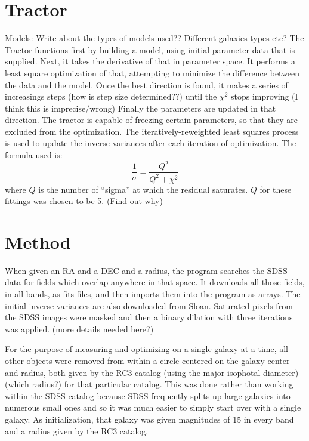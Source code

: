 \documentclass[12pt,preprint,dvipdf]{aastex}
\begin{document}
\section{Tractor}
Models: Write about the types of models used?? Different galaxies types etc?
The Tractor functions first by building a model, using initial parameter data that is supplied. Next, it takes the derivative of that in parameter space. It performs a least square optimization of that, attempting to minimize the difference between the data and the model. Once the best direction is found, it makes a series of increasings steps (how is step size determined??) until the $\chi^2$ stops improving (I think this is imprecise/wrong) Finally the parameters are updated in that direction. The tractor is capable of freezing certain parameters, so that they are excluded from the optimization. 
The iteratively-reweighted least squares process is used to update the
inverse variances after each iteration of optimization. The formula
used is: \begin{equation} \frac{1}{\sigma}=\frac{Q^2}{Q^2+\chi^2}
\end{equation}
where $Q$ is the number of ``sigma'' at which the residual saturates. $Q$ for these fittings was chosen to be 5. (Find out why)

\section{Method}
When given an RA and a DEC and a radius, the program searches the SDSS data for fields which overlap anywhere in that space. It downloads all those fields, in all bands, as fits files, and then imports them into the program as arrays. The initial inverse variances are also downloaded from Sloan.
Saturated pixels from the SDSS images were masked and then a binary dilation with three iterations was applied. (more details needed here?)

For the purpose of measuring and optimizing on a single galaxy at a
time, all other objects were removed from within a circle centered on
the galaxy center and radius, both given by the RC3 catalog (using the major isophotal diameter)
(which radius?) for that particular catalog. This was done rather than
working within the SDSS catalog because SDSS frequently splits up large
galaxies into numerous small ones and so it was much easier to simply
start over with a single galaxy. As initialization, that galaxy was
given magnitudes of 15 in every band and a radius given by the RC3
catalog.
\end{document}
